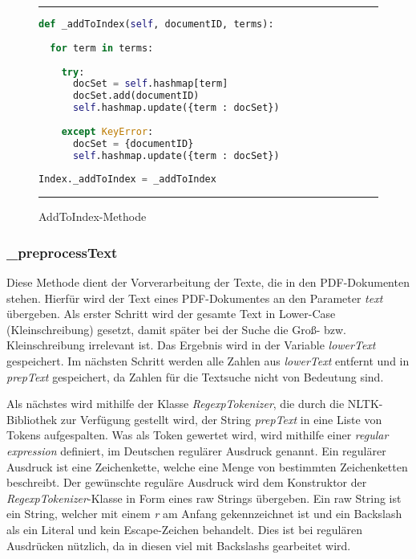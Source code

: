 \begin{figure}[h]
	\rule{\textwidth}{0.4pt}
		\begin{lstlisting}[language=Python]
def _addToIndex(self, documentID, terms):
    
  for term in terms:
        
    try:
      docSet = self.hashmap[term]
      docSet.add(documentID)
      self.hashmap.update({term : docSet})
            
    except KeyError:
      docSet = {documentID}
      self.hashmap.update({term : docSet})
    
Index._addToIndex = _addToIndex
		\end{lstlisting}
	\rule{\textwidth}{0.4pt}
	\caption{AddToIndex-Methode}
	\label{fig:addToIndex}
\end{figure}

\subsubsection{\_preprocessText}
Diese Methode dient der Vorverarbeitung der Texte, die in den PDF-Dokumenten stehen. Hierfür wird der Text eines PDF-Dokumentes an den Parameter \textit{text} übergeben. Als erster Schritt wird der gesamte Text in Lower-Case (Kleinschreibung) gesetzt, damit später bei der Suche die Groß- bzw. Kleinschreibung irrelevant ist. Das Ergebnis wird in der Variable \textit{lowerText} gespeichert. Im nächsten Schritt werden alle Zahlen aus \textit{lowerText} entfernt und in \textit{prepText} gespeichert, da Zahlen für die Textsuche nicht von Bedeutung sind.

Als nächstes wird mithilfe der Klasse \textit{RegexpTokenizer}, die durch die NLTK-Bibliothek zur Verfügung gestellt wird, der String \textit{prepText} in eine Liste von Tokens aufgespalten. Was als Token gewertet wird, wird mithilfe einer \textit{regular expression} definiert, im Deutschen regulärer Ausdruck genannt. Ein regulärer Ausdruck ist eine Zeichenkette, welche eine Menge von bestimmten Zeichenketten beschreibt. Der gewünschte reguläre Ausdruck wird dem Konstruktor der \textit{RegexpTokenizer}-Klasse in Form eines raw Strings übergeben. Ein raw String ist ein String, welcher mit einem \textit{r} am Anfang gekennzeichnet ist und ein Backslash als ein Literal und kein Escape-Zeichen behandelt. Dies ist bei regulären Ausdrücken nützlich, da in diesen viel mit Backslashs gearbeitet wird.

